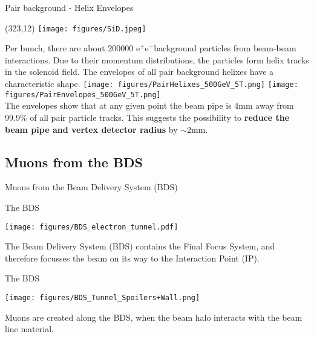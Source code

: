 \documentclass[xcolor={dvipsnames}]{beamer}
\newcommand{\sidlogo}{
  \setlength{\TPHorizModule}{1pt}
  \setlength{\TPVertModule}{1pt}
  \begin{textblock}{1}(323,12)
   \texttt{[image: figures/SiD.jpeg]}
  \end{textblock}
  }
\newcommand{\electron}{e$^-$}
\newcommand{\positron}{e$^+$}
\begin{document}
\begin{frame}{Pair background - Helix Envelopes}
\sidlogo
Per bunch, there are about \num{200000} \positron \electron background particles from beam-beam interactions.
Due to their momentum distributions, the particles form helix tracks in the solenoid field.
The envelopes of all pair background helixes have a characteristic shape.
   \texttt{[image: figures/PairHelixes\_500GeV\_5T.png]}\hspace*{0.1cm}
   \texttt{[image: figures/PairEnvelopes\_500GeV\_5T.png]}\\
The envelopes show that at any given point the beam pipe is 4mm away from 99.9\% of all pair particle tracks.
This suggests the possibility to \textbf{reduce the beam pipe and vertex detector radius} by $\sim$2mm.
\end{frame}

\subsection{Muons from the BDS}
\begin{frame}
 \begin{center}
  \LARGE Muons from the Beam Delivery System (BDS)
 \end{center}

\end{frame}


\begin{frame}{The BDS}
\begin{center}
  \texttt{[image: figures/BDS\_electron\_tunnel.pdf]}
  \end{center}
The Beam Delivery System (BDS) contains the Final Focus System, and therefore focusses the beam on its way to the Interaction Point (IP).
\end{frame}
  \begin{frame}{The BDS}
\begin{center}
  \texttt{[image: figures/BDS\_Tunnel\_Spoilers+Wall.png]}
\end{center}
Muons are created along the BDS, when the beam halo interacts with the beam line material.
\end{frame}
\end{document}
